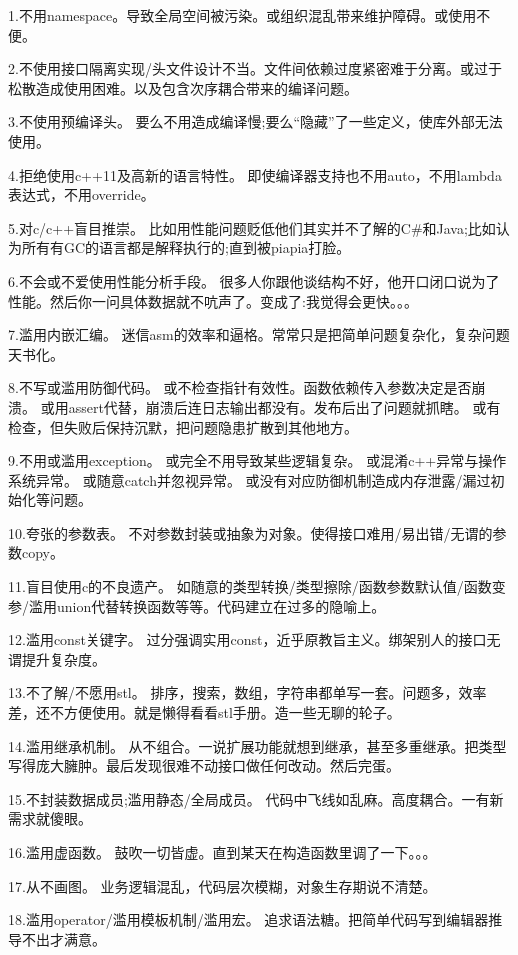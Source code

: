 \documentclass[11pt]{article}
\begin{document}
1.不用namespace。导致全局空间被污染。或组织混乱带来维护障碍。或使用不便。

2.不使用接口隔离实现/头文件设计不当。文件间依赖过度紧密难于分离。或过于松散造成使用困难。以及包含次序耦合带来的编译问题。

3.不使用预编译头。
要么不用造成编译慢;要么“隐藏”了一些定义，使库外部无法使用。

4.拒绝使用c++11及高新的语言特性。
即使编译器支持也不用auto，不用lambda表达式，不用override。

5.对c/c++盲目推崇。
比如用性能问题贬低他们其实并不了解的C\#和Java;比如认为所有有GC的语言都是解释执行的;直到被piapia打脸。

6.不会或不爱使用性能分析手段。
很多人你跟他谈结构不好，他开口闭口说为了性能。然后你一问具体数据就不吭声了。变成了:我觉得会更快。。。

7.滥用内嵌汇编。
迷信asm的效率和逼格。常常只是把简单问题复杂化，复杂问题天书化。

8.不写或滥用防御代码。
或不检查指针有效性。函数依赖传入参数决定是否崩溃。
或用assert代替，崩溃后连日志输出都没有。发布后出了问题就抓瞎。
或有检查，但失败后保持沉默，把问题隐患扩散到其他地方。

9.不用或滥用exception。
或完全不用导致某些逻辑复杂。
或混淆c++异常与操作系统异常。
或随意catch并忽视异常。
或没有对应防御机制造成内存泄露/漏过初始化等问题。

10.夸张的参数表。
不对参数封装或抽象为对象。使得接口难用/易出错/无谓的参数copy。

11.盲目使用c的不良遗产。
如随意的类型转换/类型擦除/函数参数默认值/函数变参/滥用union代替转换函数等等。代码建立在过多的隐喻上。

12.滥用const关键字。
过分强调实用const，近乎原教旨主义。绑架别人的接口无谓提升复杂度。

13.不了解/不愿用stl。
排序，搜索，数组，字符串都单写一套。问题多，效率差，还不方便使用。就是懒得看看stl手册。造一些无聊的轮子。

14.滥用继承机制。
从不组合。一说扩展功能就想到继承，甚至多重继承。把类型写得庞大臃肿。最后发现很难不动接口做任何改动。然后完蛋。

15.不封装数据成员;滥用静态/全局成员。
代码中飞线如乱麻。高度耦合。一有新需求就傻眼。

16.滥用虚函数。
鼓吹一切皆虚。直到某天在构造函数里调了一下。。。

17.从不画图。
业务逻辑混乱，代码层次模糊，对象生存期说不清楚。

18.滥用operator/滥用模板机制/滥用宏。
追求语法糖。把简单代码写到编辑器推导不出才满意。
\end{document}
